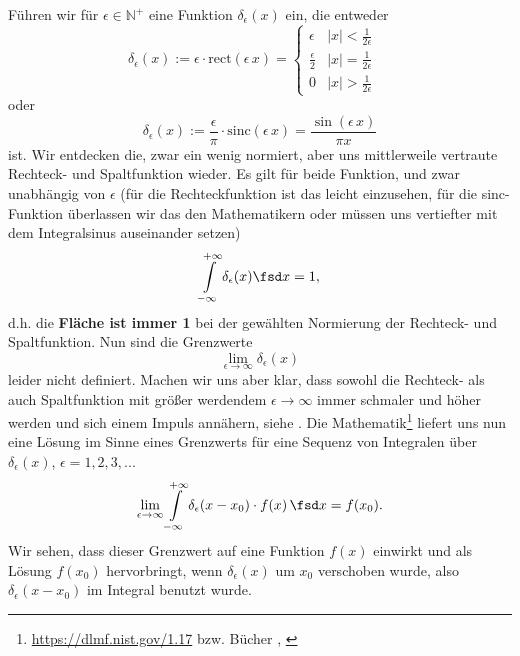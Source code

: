 \begin{Werkzeug}
Führen wir für $\epsilon\in\mathbb{N}^+$ eine Funktion $\delta_\epsilon(x)$ ein, die entweder
\begin{equation}
\delta_\epsilon(x) := \epsilon \cdot \mathrm{rect}(\epsilon \, x) =
\begin{cases} \epsilon & |x| < \frac{1}{2 \epsilon} \\ \frac{\epsilon}{2} & |x| = \frac{1}{2 \epsilon} \\ 0 & |x| > \frac{1}{2 \epsilon} \end{cases}\quad
\end{equation}
oder
\begin{equation}
\delta_\epsilon(x) := \frac{\epsilon}{\pi} \cdot \mathrm{sinc}(\epsilon \, x) = \frac{\sin(\epsilon \, x)}{\pi x}
\end{equation}
ist.
Wir entdecken die, zwar ein wenig normiert, aber uns mittlerweile vertraute
Rechteck- und Spaltfunktion  wieder.
%
Es gilt für beide Funktion, und zwar unabhängig von $\epsilon$ (für die
Rechteckfunktion ist das leicht einzusehen, für die sinc-Funktion überlassen wir
das den Mathematikern oder müssen uns vertiefter mit dem Integralsinus auseinander setzen)
\begin{equation}
\int\limits_{-\infty}^{+\infty} \delta_\epsilon(x) \fsd x = 1,
\end{equation}
d.h. die \textbf{Fläche ist immer 1} bei der gewählten Normierung der
Rechteck- und Spaltfunktion.
%
Nun sind die Grenzwerte
\begin{equation}
\lim_{\epsilon\to\infty} \delta_\epsilon(x)
\end{equation}
leider nicht definiert.
%
Machen wir uns aber klar, dass sowohl die Rechteck- als auch Spaltfunktion mit
größer werdendem $\epsilon\to \infty$ immer schmaler und höher werden und sich
einem Impuls annähern, siehe .
%
Die Mathematik\footnote{\url{https://dlmf.nist.gov/1.17} bzw. Bücher
\cite[Kapitel 1.15]{Arfken2005}, \cite{Burg2013}}
liefert uns nun eine Lösung im Sinne eines Grenzwerts für eine
Sequenz von Integralen über $\delta_\epsilon(x)$, $\epsilon=1,2,3,...$
\begin{equation}
\lim_{\epsilon\to\infty} \int\limits_{-\infty}^{+\infty}
\delta_\epsilon(x-x_0) \cdot f(x) \, \fsd x = f(x_0).
\end{equation}
Wir sehen, dass dieser Grenzwert auf eine Funktion $f(x)$ einwirkt und als Lösung
$f(x_0)$ hervorbringt, wenn $\delta_\epsilon(x)$ um $x_0$ verschoben wurde, also
$\delta_\epsilon(x-x_0)$ im Integral benutzt wurde.

\end{Werkzeug}
